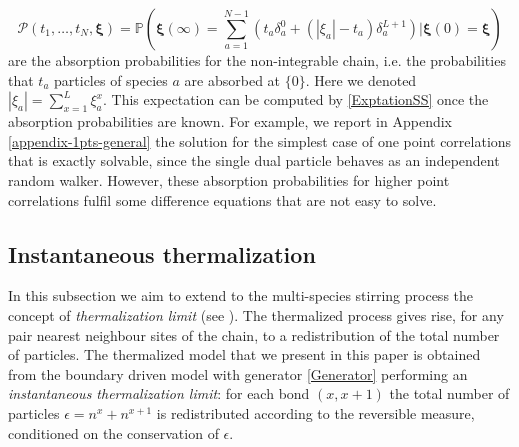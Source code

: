 \documentclass[10pt]{article}
\numberwithin{equation}{section}
\numberwithin{equation}{subsection}
\begin{document}
\begin{equation}\label{Pass} 
	\mathcal{P}(t_{1},\ldots,t_{N},\bm{\xi})	=\mathbb{P}\left(\bm{\xi}(\infty)=\sum_{a=1}^{N-1}\left(t_{a}\delta_{a}^{0}+(|\xi_{a}|-t_{a})\delta_{a}^{L+1}\right)| \bm{\xi}(0)=\bm{\xi}\right)
\end{equation}
are the absorption probabilities for the non-integrable chain, i.e. the probabilities that $t_{a}$ particles of species $a$ are absorbed at $\{0\}$. Here we denoted $|\xi_{a}|=\sum_{x=1}^{L}\xi_{a}^{x}$.
 This expectation can be computed by \eqref{ExptationSS} once the absorption probabilities are known.  For example, we report in Appendix \ref{appendix-1pts-general} the solution for the simplest case of one point correlations that is exactly solvable, since the single dual particle behaves as an independent random walker. However, these absorption probabilities for higher point correlations fulfil some difference equations that are not easy to solve.


\subsection{Instantaneous thermalization}\label{Subsection-Thermalized}
In this subsection we aim to extend to the multi-species stirring process the concept of \textit{thermalization limit} (see \cite{carinci2013duality,KMP}). The thermalized process gives rise, for any pair nearest neighbour sites of the chain, to a redistribution of the total number of particles. The thermalized model that we present in this paper is obtained from the boundary driven model with generator \eqref{Generator} performing an \textit{instantaneous thermalization limit}: for each bond $(x,x+1)$ the total number of particles $\epsilon=n^{x}+n^{x+1}$ is redistributed according to the reversible measure, conditioned on the conservation of $\epsilon$. 
\end{document}
